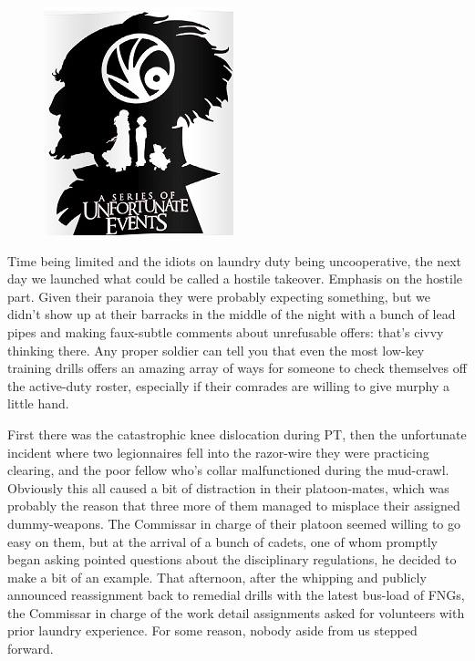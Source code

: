 \begin{figure}
	\begin{center}
		\includegraphics[width=\figwidth]{pics/21/34.png}
	\end{center}
\end{figure}
Time being limited and the idiots on laundry duty being uncooperative, the next day we launched what could be called a hostile takeover. 
Emphasis on the hostile part. 
Given their paranoia they were probably expecting something, but we didn't show up at their barracks in the middle of the night with a bunch of lead pipes and making faux-subtle comments about unrefusable offers: 
that's civvy thinking there. 
Any proper soldier can tell you that even the most low-key training drills offers an amazing array of ways for someone to check themselves off the active-duty roster, especially if their comrades are willing to give murphy a little hand. 


First there was the catastrophic knee dislocation during PT, then the unfortunate incident where two legionnaires fell into the razor-wire they were practicing clearing, and the poor fellow who's collar malfunctioned during the mud-crawl. 
Obviously this all caused a bit of distraction in their platoon-mates, which was probably the reason that three more of them managed to misplace their assigned dummy-weapons. 
The Commissar in charge of their platoon seemed willing to go easy on them, but at the arrival of a bunch of cadets, one of whom promptly began asking pointed questions about the disciplinary regulations, he decided to make a bit of an example. 
That afternoon, after the whipping and publicly announced reassignment back to remedial drills with the latest bus-load of FNGs, the Commissar in charge of the work detail assignments asked for volunteers with prior laundry experience. 
For some reason, nobody aside from us stepped forward.


